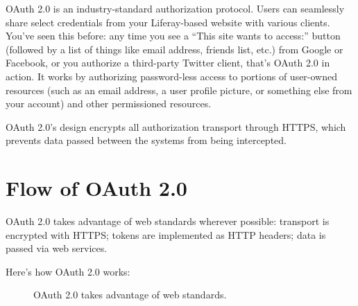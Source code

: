 OAuth 2.0 is an industry-standard authorization protocol. Users can
seamlessly share select credentials from your Liferay-based website with
various clients. You've seen this before: any time you see a ``This site
wants to access:'' button (followed by a list of things like email
address, friends list, etc.) from Google or Facebook, or you authorize a
third-party Twitter client, that's OAuth 2.0 in action. It works by
authorizing password-less access to portions of user-owned resources
(such as an email address, a user profile picture, or something else
from your account) and other permissioned resources.

OAuth 2.0's design encrypts all authorization transport through HTTPS,
which prevents data passed between the systems from being intercepted.

\section{Flow of OAuth 2.0}\label{flow-of-oauth-2.0}

OAuth 2.0 takes advantage of web standards wherever possible: transport
is encrypted with HTTPS; tokens are implemented as HTTP headers; data is
passed via web services.

Here's how OAuth 2.0 works:

\begin{figure}
\centering
{}
\caption{OAuth 2.0 takes advantage of web standards.}
\end{figure}

